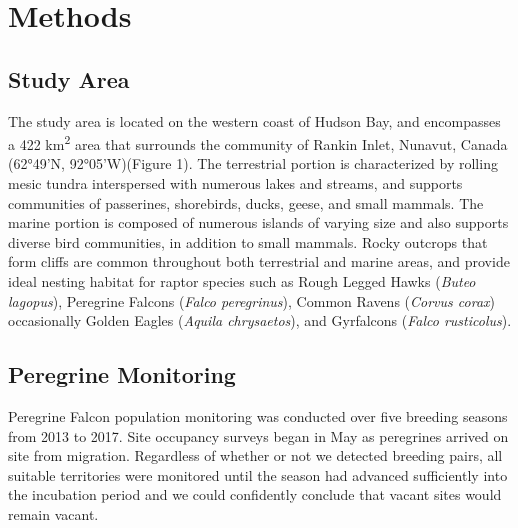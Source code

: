 \section{Methods}
 
 
 
 
\subsection{Study Area}

The study area is located on the western coast of Hudson Bay, and encompasses a 422 km\textsuperscript{2} area that surrounds the community of Rankin Inlet, Nunavut, Canada (62°49'N, 92°05'W)(Figure 1). 
The terrestrial portion is characterized by rolling mesic tundra interspersed with numerous lakes and streams, and supports communities of passerines, shorebirds, ducks, geese, and small mammals. 
The marine portion is composed of numerous islands of varying size and also supports diverse bird communities, in addition to small mammals. 
Rocky outcrops that form cliffs are common throughout both terrestrial and marine areas, and provide ideal nesting habitat for raptor species such as Rough Legged Hawks (\textit{Buteo lagopus}), Peregrine Falcons (\textit{Falco peregrinus}), Common Ravens (\textit{Corvus corax}) occasionally Golden Eagles (\textit{Aquila chrysaetos}), and Gyrfalcons (\textit{Falco rusticolus}).   
 
 
 
\subsection{Peregrine Monitoring}

Peregrine Falcon population monitoring was conducted over five breeding seasons from 2013 to 2017.
Site occupancy surveys began in May as peregrines arrived on site from migration.
Regardless of whether or not we detected breeding pairs, all suitable territories were monitored until the season had advanced sufficiently into the incubation period and we could confidently conclude that vacant sites would remain vacant.


